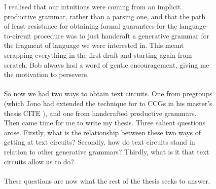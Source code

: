 \begin{figure}[h!]
\centering
{}
\caption{I realised that our intuitions were coming from an implicit productive grammar, rather than a parsing one, and that the path of least resistance for obtaining formal guarantees for the language-to-circuit procedure was to just handcraft a generative grammar for the fragment of language we were interested in. This meant scrapping everything in the first draft and starting again from scratch. Bob always had a word of gentle encouragement, giving me the motivation to persevere.\\
\\

So now we had two ways to obtain text circuits. One from pregroups (which Jono had extended the technique for to CCGs in his master's thesis \bR CITE \e), and one from handcrafted productive grammars. Then came time for me to write my thesis. Three salient questions arose. Firstly, what is the relationship between these two ways of getting at text circuits? Secondly, how do text circuits stand in relation to other generative grammars? Thirdly, what is it that text circuits allow us to do?\\ \\

These questions are now what the rest of the thesis seeks to answer.
}
\end{figure}